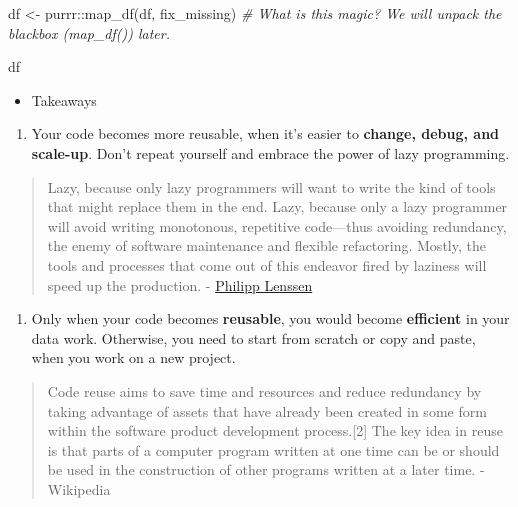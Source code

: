 \documentclass[
]{book}
\newenvironment{Shaded}{\begin{snugshade}}{\end{snugshade}}
\newcommand{\CommentTok}[1]{\textcolor[rgb]{0.56,0.35,0.01}{\textit{#1}}}
\newcommand{\FunctionTok}[1]{\textcolor[rgb]{0.00,0.00,0.00}{#1}}
\newcommand{\NormalTok}[1]{#1}
\newcommand{\OtherTok}[1]{\textcolor[rgb]{0.56,0.35,0.01}{#1}}
\newcommand{\SpecialCharTok}[1]{\textcolor[rgb]{0.00,0.00,0.00}{#1}}
\providecommand{\tightlist}{%
  \setlength{\itemsep}{0pt}\setlength{\parskip}{0pt}}
\begin{document}
\begin{Shaded}
\begin{Highlighting}[]
\NormalTok{df }\OtherTok{\textless{}{-}}\NormalTok{ purrr}\SpecialCharTok{::}\FunctionTok{map\_df}\NormalTok{(df, fix\_missing) }\CommentTok{\# What is this magic? We will unpack the blackbox (\textasciigrave{}map\_df()\textasciigrave{}) later.}

\NormalTok{df}
\end{Highlighting}
\end{Shaded}

\begin{itemize}
\tightlist
\item
  Takeaways
\end{itemize}

\begin{enumerate}
\def\labelenumi{\arabic{enumi}.}
\tightlist
\item
  Your code becomes more reusable, when it's easier to \textbf{change, debug, and scale-up}. Don't repeat yourself and embrace the power of lazy programming.
\end{enumerate}

\begin{quote}
Lazy, because only lazy programmers will want to write the kind of tools that might replace them in the end. Lazy, because only a lazy programmer will avoid writing monotonous, repetitive code---thus avoiding redundancy, the enemy of software maintenance and flexible refactoring. Mostly, the tools and processes that come out of this endeavor fired by laziness will speed up the production. - \href{http://blogoscoped.com/archive/2005-08-24-n14.html}{Philipp Lenssen}
\end{quote}

\begin{enumerate}
\def\labelenumi{\arabic{enumi}.}
\setcounter{enumi}{1}
\tightlist
\item
  Only when your code becomes \textbf{reusable}, you would become \textbf{efficient} in your data work. Otherwise, you need to start from scratch or copy and paste, when you work on a new project.
\end{enumerate}

\begin{quote}
Code reuse aims to save time and resources and reduce redundancy by taking advantage of assets that have already been created in some form within the software product development process.{[}2{]} The key idea in reuse is that parts of a computer program written at one time can be or should be used in the construction of other programs written at a later time. - Wikipedia
\end{quote}
\end{document}
